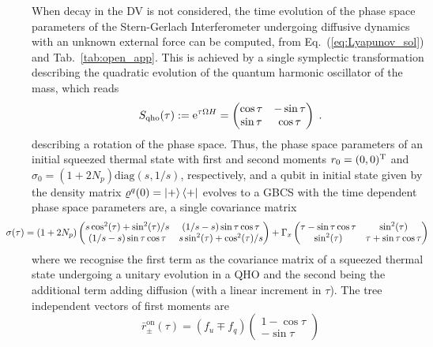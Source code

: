 \documentclass[%
reprint,
superscriptaddress,
nofootinbib,
 amsmath,amssymb,
prx,
floatfix,
]{revtex4-2}
\begin{document}
When decay in the DV is not considered, the time evolution of the phase space parameters of the Stern-Gerlach Interferometer undergoing diffusive dynamics with an unknown external force can be computed, from Eq.~(\ref{eq:Lyapunov_sol}) and Tab.~\ref{tab:open_app}. This is achieved by a single symplectic transformation describing the quadratic evolution of the quantum harmonic oscillator of the mass, which reads
\begin{equation}
    S_{\text{qho}}(\tau) := {\rm e}^{\tau \Omega H} = \begin{pmatrix}
        \cos \tau & - \sin \tau \\ 
        \sin \tau & \cos \tau
    \end{pmatrix} \;.
\end{equation}
describing a rotation of the phase space. Thus, the phase space parameters of an initial squeezed thermal state with first and second moments $r_0 = (0,0)^{\rm T}$  and $\sigma_0 = (1+2N_p) \text{diag}(s, 1/s)$, respectively, and a qubit in initial state given by the density matrix  $\varrho^q(0) = \ket{+}\bra{+}$ evolves to a GBCS with the time dependent phase space parameters are, a single covariance matrix
\begin{equation} \label{eq:covariance_SG}
    \hspace{-1cm}\sigma(\tau) = (1 + 2 N_p) 
\begin{pmatrix}
 s \cos ^2(\tau) +\sin ^2(\tau) /s &  \left(1/s - s \right) \sin \tau  \cos \tau  \\
 \left(1/s - s \right) \sin \tau  \cos \tau   & s \sin ^2(\tau) +\cos ^2(\tau) /s \\    
\end{pmatrix}
+ \Gamma_x
\begin{pmatrix}
     \tau -\sin \tau  \cos \tau  & \sin ^2(\tau)  \\
 \sin ^2(\tau)  & \tau +\sin \tau  \cos \tau  \\
\end{pmatrix}
\end{equation}
where we recognise the first term as the covariance matrix of a squeezed thermal state undergoing a unitary evolution in a QHO and the second being the additional term adding diffusion (with a linear increment in $\tau$). The tree independent vectors of first moments are
\begin{equation}
    \bar{r}^{\text{on}}_{\pm} (\tau)
    = \left(f_u \mp f_q\right)
\begin{pmatrix}
1 - \cos \tau  \\
  - \sin \tau  
\end{pmatrix} \nonumber
\end{equation}
\end{document}
